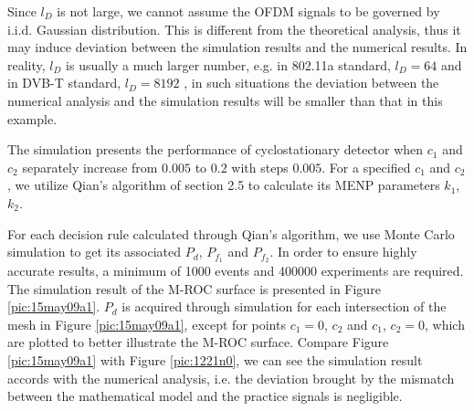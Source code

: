 Since $l_D$ is not large, we cannot assume the OFDM signals to be governed by i.i.d. Gaussian distribution. This is different from the theoretical analysis, thus it may induce deviation between the simulation results and the numerical results. In reality, $l_D$ is usually a much larger number, e.g. in 802.11a standard, $l_D = 64$ \cite{1000232} and  in DVB-T standard, $l_D = 8192$ \cite{lunden2010robust}, in such situations the deviation between the numerical analysis and the simulation results will be smaller than that in this example.

The simulation presents the performance of cyclostationary detector when $c_1$ and $c_2$ separately increase from $0.005$ to $0.2$ with steps $0.005$. For a specified $c_1$ and $c_2$, we utilize Qian's algorithm of section 2.5 to calculate its MENP parameters $k_1$, $k_2$.

For each decision rule calculated through Qian's algorithm, we use Monte Carlo simulation to get its associated $P_d$, $P_{f_1}$ and $P_{f_2}$.   
In order to ensure highly accurate results, a minimum of 1000 events and 400000 experiments are required. The simulation result of the M-ROC surface is presented in Figure \ref{pic:15may09a1}. $P_d$ is acquired through simulation for each intersection of the mesh in Figure \ref{pic:15may09a1}, except for points $c_1 = 0$, $c_2$ and $c_1$, $c_2 = 0$, which are plotted to better illustrate the M-ROC surface. 
Compare Figure \ref{pic:15may09a1} with Figure \ref{pic:1221n0}, we can see the simulation result accords with the numerical analysis, i.e. the deviation brought by the mismatch between the mathematical model and the practice signals is negligible.
 
